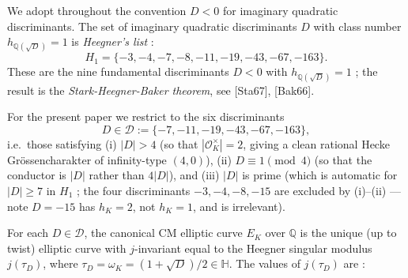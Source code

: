 \documentclass[
  11pt,
  a4paper,
]{amsart}
\begin{document}
We adopt throughout the convention \(D < 0\) for imaginary quadratic discriminants. The set of imaginary quadratic discriminants \(D\) with class number \(h_{\mathbb{Q}(\sqrt D)} = 1\) is \emph{Heegner's list} :
\[
H_1 = \{-3, -4, -7, -8, -11, -19, -43, -67, -163\}.
\]
These are the nine fundamental discriminants \(D < 0\) with \(h_{\mathbb{Q}(\sqrt D)} = 1\) ; the result is the \emph{Stark-Heegner-Baker theorem}, see {[}Sta67{]}, {[}Bak66{]}.

For the present paper we restrict to the six discriminants
\[
D \in \mathcal{D} := \{-7, -11, -19, -43, -67, -163\},
\]
i.e.~those satisfying (i) \(|D| > 4\) (so that \(|\mathcal{O}_K^\times| = 2\), giving a clean rational Hecke Grössencharakter of infinity-type \((4, 0)\)), (ii) \(D \equiv 1 \pmod 4\) (so that the conductor is \(|D|\) rather than \(4|D|\)), and (iii) \(|D|\) is prime (which is automatic for \(|D| \geq 7\) in \(H_1\) ; the four discriminants \(-3, -4, -8, -15\) are excluded by (i)--(ii) --- note \(D = -15\) has \(h_K = 2\), not \(h_K = 1\), and is irrelevant).

For each \(D \in \mathcal{D}\), the canonical CM elliptic curve \(E_K\) over \(\mathbb{Q}\) is the unique (up to twist) elliptic curve with \(j\)-invariant equal to the Heegner singular modulus \(j(\tau_D)\), where \(\tau_D = \omega_K = (1 + \sqrt D)/2 \in \mathbb{H}\). The values of \(j(\tau_D)\) are :
\end{document}
